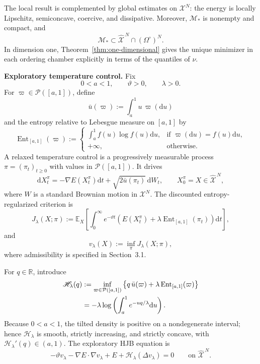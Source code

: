 \documentclass[11pt]{article}
\def\Mc{{\mathcal M}}
\def\Xc{{\mathcal X}}
\def\hX{\widehat{\Xc}^{\,N}}
\newcommand{\dd}{\mathrm{d}}
\newcommand{\Ent}{\operatorname{Ent}}
\theoremstyle{definition}
\theoremstyle{remark}
\numberwithin{equation}{section}
\begin{document}
The local result is complemented by global estimates on $\Xc^N$: the energy is locally Lipschitz,
semiconcave, coercive, and dissipative.  Moreover, $\Mc_*$ is nonempty and compact, and
\[
 \Mc_*\subset\hX\cap(\Omega^\circ)^N.
\]
In dimension one, Theorem~\ref{thm:one-dimensional} gives the unique minimizer in each ordering
chamber explicitly in terms of the quantiles of $\nu$.

\medskip

\noindent\textbf{Exploratory temperature control.}
Fix
\[
 0<a<1,
 \qquad
 \vartheta>0,
 \qquad
 \lambda>0.
\]
For $\varpi\in\mathcal P([a,1])$, define
\[
 \bar u(\varpi):=\int_a^1u\,\varpi(\dd u)
\]
and the entropy relative to Lebesgue measure on $[a,1]$ by
\[
 \Ent_{[a,1]}(\varpi)
 :=
 \begin{cases}
 \displaystyle\int_a^1f(u)\log f(u)\dd u,
 &\text{if }\varpi(\dd u)=f(u)\dd u,\\[1.2ex]
 +\infty,
 &\text{otherwise}.
 \end{cases}
\]
A relaxed temperature control is a progressively measurable process
$\pi=(\pi_t)_{t\ge0}$ with values in $\mathcal P([a,1])$.  It drives
\begin{equation}\label{eq:controlled-SDE-main-results}
 \dd X_t^\pi
 =-\nabla E(X_t^\pi)\dd t
 +\sqrt{2\bar u(\pi_t)}\,\dd W_t,
 \qquad
 X_0^\pi=X\in\hX,
\end{equation}
where $W$ is a standard Brownian motion in $\Xc^N$.  The discounted entropy-regularized criterion is
\begin{equation}\label{eq:cost-main-results}
 J_\lambda(X;\pi)
 :=\mathbb E_X\left[
 \int_0^\infty e^{-\vartheta t}
 \left(E(X_t^\pi)+\lambda\Ent_{[a,1]}(\pi_t)\right)\dd t
 \right],
\end{equation}
and
\[
 v_\lambda(X):=\inf_\pi J_\lambda(X;\pi),
\]
where admissibility is specified in Section~3.1.

For $q\in\mathbb R$, introduce
\begin{align}
 \mathscr H_\lambda(q)
 &:=
 \inf_{\varpi\in\mathcal P([a,1])}
 \left\{q\,\bar u(\varpi)+\lambda\Ent_{[a,1]}(\varpi)\right\}
 \notag\\
 &=-\lambda\log\left(\int_a^1e^{-uq/\lambda}\dd u\right).
 \label{eq:Hamiltonian-main-results}
\end{align}
Because $0<a<1$, the tilted density is positive on a nondegenerate interval; hence
$\mathscr H_\lambda$ is smooth, strictly increasing, and strictly concave, with
$\mathscr H_\lambda'(q)\in(a,1)$.  The exploratory HJB equation is
\begin{equation}\label{eq:exploratory-HJB-main-results}
 -\vartheta v_\lambda
 -\nabla E\cdot\nabla v_\lambda
 +E
 +\mathscr H_\lambda(\Delta v_\lambda)
 =0
 \qquad\text{on }\hX.
\end{equation}
\end{document}

